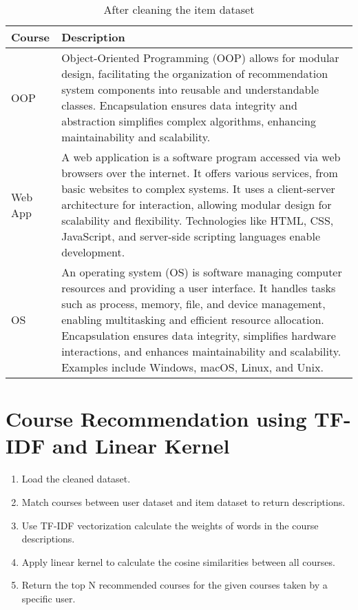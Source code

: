 \begin{table}[H]
\center
\small
\begin{tabular}{p{3cm}p{10.85cm}}
    \toprule
    \textbf{Course} & \textbf{Description} \\
    \midrule
    OOP &Object-Oriented Programming (OOP) allows for modular design, facilitating the organization 
    of recommendation system components into reusable and understandable classes. 
    Encapsulation ensures data integrity and abstraction simplifies complex algorithms, 
    enhancing maintainability and scalability. \\
    Web App &A web application is a software program accessed via web browsers over the internet. 
    It offers various services, from basic websites to complex systems. It uses a client-server 
    architecture for interaction, allowing modular design for scalability and flexibility. Technologies 
    like HTML, CSS, JavaScript, and server-side scripting languages enable development. \\
    OS &An operating system (OS) is software managing computer resources and providing a user interface. 
    It handles tasks such as process, memory, file, and device management, enabling multitasking and 
    efficient resource allocation. Encapsulation ensures data integrity, simplifies hardware interactions, 
    and enhances maintainability and scalability. Examples include Windows, macOS, Linux, and Unix. \\
    \bottomrule
\end{tabular}
\caption{After cleaning the item dataset}
\end{table}

\newpage
\section{Course Recommendation using TF-IDF and Linear Kernel}
\begin{enumerate}
    \item \textsf{Load the cleaned dataset.}
    \item \textsf{Match courses between user dataset and item dataset to return descriptions.}
    \item \textsf{Use TF-IDF vectorization calculate the weights of words in the course descriptions.}
    \item \textsf{Apply linear kernel to calculate the cosine similarities between all courses.}
    \item \textsf{Return the top N recommended courses for the given courses taken by a specific user.}
\end{enumerate}

